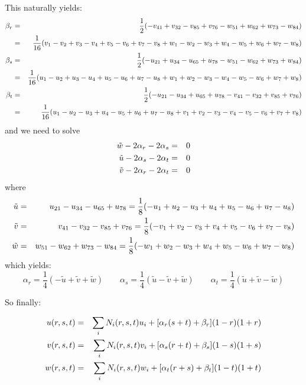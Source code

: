 This naturally yields:
\begin{eqnarray}
\beta_r
&=& \frac{1}{2} ( -v_{41} +v_{32} -v_{85} + v_{76} - w_{51} + w_{62} + w_{73} -w_{84}  ) \nonumber\\
&=& \frac{1}{16} (v_1-v_2+v_3-v_4+v_5-v_6+v_7-v_8  +w_1-w_2 - w_3 + w_4 - w_5 + w_6 +w_7  - w_8    )  \nonumber\\
\beta_s&=& \frac{1}{2} ( -u_{21} +u_{34} -u_{65} + u_{78} - w_{51} - w_{62} + w_{73} +w_{84}  ) \nonumber\\
&=& \frac{1}{16} (u_1-u_2+u_3-u_4+u_5-u_6+u_7-u_8  +w_1 + w_2 - w_3 - w_4 - w_5 - w_6 +w_7 + w_8   )  \nonumber\\
\beta_t&=& \frac{1}{2} ( -u_{21} -u_{34} +u_{65} + u_{78} - v_{41} - v_{32} + v_{85} +v_{76}   ) \nonumber\\
&=& \frac{1}{16} ( u_1-u_2-u_3+u_4 -u_5 + u_6 + u_7 - u_8 +v_1 +v_2 - v_3 - v_4 - v_5 - v_6 + v_7 + v_8  )  \nonumber
\end{eqnarray}
and we need to solve
\begin{eqnarray}
\tilde{w} -2\alpha_r -2\alpha_s&=&0\nonumber\\
\tilde{u} -2\alpha_s -2\alpha_t&=&0\nonumber\\
\tilde{v} -2\alpha_r -2\alpha_t&=&0\nonumber
\end{eqnarray}
where
\begin{eqnarray}
\tilde{u} 
&=& u_{21} -u_{34} -u_{65} + u_{78} 
=\frac{1}{8}(-u_1 + u_2-u_3+u_4 + u_5-u_6 + u_7-u_8  )
\nonumber\\
\tilde{v} 
&=& v_{41} -v_{32} -v_{85} + v_{76}
= \frac{1}{8} (-v_1 + v_2 - v_3 + v_4 + v_5 - v_6 + v_7 - v_8    )
  \nonumber\\ 
\tilde{w} 
&=&  w_{51} -w_{62} +w_{73} - w_{84} 
=\frac{1}{8} (-w_1+w_2-w_3+w_4 + w_5 - w_6 + w_7 -w_8  )
\nonumber
\end{eqnarray}
which yields:
\[
\alpha_r=\frac{1}{4} ( -\tilde{u} + \tilde{v} + \tilde{w} ) 
\quad\quad
\alpha_s=\frac{1}{4} ( \tilde{u} - \tilde{v} + \tilde{w} ) 
\quad\quad
\alpha_t=\frac{1}{4} ( \tilde{u} + \tilde{v} - \tilde{w} ) 
\]

So finally:

\begin{eqnarray}
u(r,s,t)&=&\sum_i N_i(r,s,t) u_i + [\alpha_r (s+t) +\beta_r](1-r)(1+r) \nonumber\\
v(r,s,t)&=&\sum_i N_i(r,s,t) v_i + [\alpha_s (r+t) +\beta_s](1-s)(1+s) \nonumber\\
w(r,s,t)&=&\sum_i N_i(r,s,t) w_i + [\alpha_t (r+s) +\beta_t](1-t)(1+t) \nonumber
\end{eqnarray}


